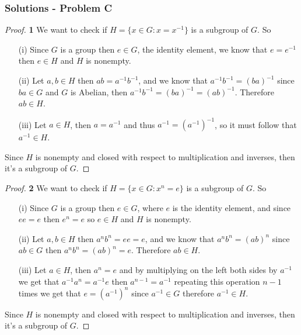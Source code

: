 \documentclass[11pt]{article}
\begin{document}
\cleardoublepage
	\subsubsection*{Solutions - Problem C}
	\begin{proof}{\textbf{1}}
		We want to check if $H = \{x \in G: x=x^{-1}\}$ is a subgroup of $G$. So
		\begin{itemize}
			\item[(i)] Since $G$ is a group then $e \in G$, the identity element, we know that $e=e^{-1}$ then $e \in H$ and $H$ is nonempty.
			\item[(ii)] Let $a,b \in H$ then $ab=a^{-1}b^{-1}$, and we know that $a^{-1}b^{-1}=(ba)^{-1}$ since $ba \in G$ and $G$ is Abelian, then $a^{-1}b^{-1}=(ba)^{-1}=(ab)^{-1}$. Therefore $ab \in H$.
			\item[(iii)] Let $a \in H$, then $a=a^{-1}$ and thus $a^{-1}=(a^{-1})^{-1}$, so it must follow that $a^{-1} \in H$.
		\end{itemize}
		Since $H$ is nonempty and closed with respect to multiplication and inverses, then it's a subgroup of $G$.
	\end{proof}
	\begin{proof}{\textbf{2}}
		We want to check if $H = \{x \in G: x^{n}=e\}$ is a subgroup of $G$. So
		\begin{itemize}
			\item[(i)] Since $G$ is a group then $e \in G$, where $e$ is the identity element, and since $ee=e$ then $e^{n}=e$ so $e \in H$ and $H$ is nonempty.
			\item[(ii)] Let $a,b \in H$ then $a^{n}b^{n}=ee=e$, and we know that $a^{n}b^{n}=(ab)^{n}$ since $ab \in G$ then $a^{n}b^{n}=(ab)^{n}=e$. Therefore $ab \in H$.
			\item[(iii)] Let $a \in H$, then $a^{n}=e$ and by multiplying on the left both sides by $a^{-1}$ we get that $a^{-1}a^{n}=a^{-1}e$ then $a^{n-1}=a^{-1}$ repeating this operation $n-1$ times we get that $e=(a^{-1})^{n}$ since $a^{-1} \in G$ therefore $a^{-1} \in H$.
		\end{itemize}
		Since $H$ is nonempty and closed with respect to multiplication and inverses, then it's a subgroup of $G$.
	\end{proof}
\end{document}
